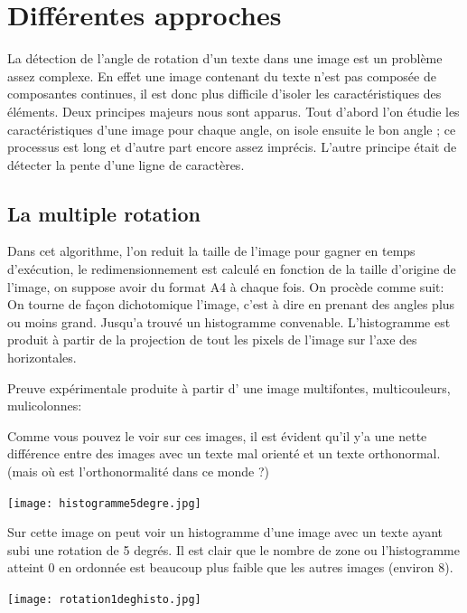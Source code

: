 \documentclass[a4paper,12pt]{report}
\begin{document}
\section{ Diff\'erentes approches}
 La d\'etection de l'angle de rotation d'un texte dans une image est un
 probl\`eme assez complexe. En effet une image contenant du texte n'est
 pas compos\'ee de composantes continues, il est donc plus difficile d'isoler
 les caract\'eristiques des \'el\'ements. Deux principes majeurs nous
 sont apparus. Tout d'abord l'on \'etudie les caract\'eristiques d'une
 image pour chaque angle, on isole ensuite le bon angle ; ce
 processus est long et d'autre part encore assez impr\'ecis.
 L'autre principe \'etait de d\'etecter la pente d'une ligne de caract\`eres.
\subsection{ La multiple rotation }
 Dans cet algorithme, l'on reduit la taille de l'image pour gagner en
 temps d'ex\'ecution, le redimensionnement est calcul\'e en fonction de la
 taille d'origine de l'image, on suppose avoir du format A4 \`a chaque
 fois. On proc\`ede comme suit: On tourne de fa\c con dichotomique
 l'image, c'est \`a dire en prenant des angles plus ou moins
 grand. Jusqu'a trouv\'e un histogramme convenable. L'histogramme est
 produit \`a partir de la projection de tout les pixels de l'image sur
 l'axe des horizontales.

Preuve exp\'erimentale produite \`a partir d' une image multifontes,
multicouleurs, mulicolonnes:

 Comme vous pouvez le voir sur ces images, il est \'evident qu'il y'a une
 nette diff\'erence entre des images avec un texte mal orient\'e et un
 texte orthonormal. (mais o\`u est l'orthonormalit\'e dans ce monde ?)


\begin{center}
	
	\texttt{[image: histogramme5degre.jpg]}\\
\end{center}


Sur cette image on peut voir un histogramme d'une image avec un
texte ayant subi une rotation de 5 degr\'es. Il est clair que le nombre
de zone ou l'histogramme atteint 0 en ordonn\'ee est beaucoup plus faible
que les autres images (environ 8).


\begin{center}
	
	\texttt{[image: rotation1deghisto.jpg]}\\
\end{center}
\end{document}
